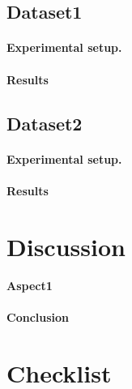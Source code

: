 \documentclass{article}
\begin{document}
\subsection{Dataset1}

\paragraph{Experimental setup.}

\paragraph{Results}

\subsection{Dataset2}

\paragraph{Experimental setup.}

\paragraph{Results}

\section{Discussion}

\paragraph{Aspect1}

\paragraph{Conclusion}






\section*{Checklist}
\end{document}
